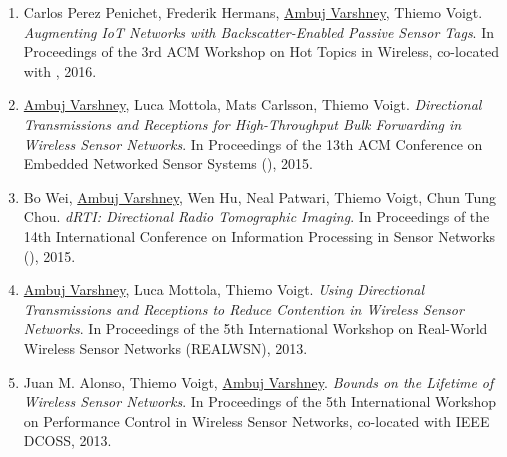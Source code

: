 \begin{enumerate}
\item Carlos Perez Penichet, Frederik Hermans, \underline{Ambuj Varshney}, Thiemo Voigt. 
\emph{Augmenting IoT Networks with Backscatter-Enabled Passive Sensor Tags}. 
In Proceedings of the 3rd ACM Workshop on Hot Topics in Wireless, co-located with , 2016.


\item \underline{Ambuj Varshney}, Luca Mottola, Mats Carlsson, Thiemo Voigt. 
\emph{Directional Transmissions and Receptions for High-Throughput Bulk Forwarding in Wireless Sensor Networks}. 
In Proceedings of the 13th ACM Conference on Embedded Networked Sensor Systems (), 2015.

\item Bo Wei, \underline{Ambuj Varshney}, Wen Hu, Neal Patwari, Thiemo Voigt, Chun Tung Chou. 
\emph{dRTI: Directional Radio Tomographic Imaging}. 
In Proceedings of the 14th International Conference on Information Processing in Sensor Networks (), 2015.


\item \underline{Ambuj Varshney}, Luca Mottola, Thiemo Voigt. 
\emph{Using Directional Transmissions and Receptions to Reduce Contention in Wireless Sensor Networks}. 
In Proceedings of the 5th International Workshop on Real-World Wireless Sensor Networks (REALWSN), 2013.

\item Juan M. Alonso, Thiemo Voigt, \underline{Ambuj Varshney}. 
\emph{Bounds on the Lifetime of Wireless Sensor Networks}. 
In Proceedings of the 5th International Workshop on Performance Control in Wireless Sensor Networks, co-located with IEEE DCOSS, 2013.

\end{enumerate}
